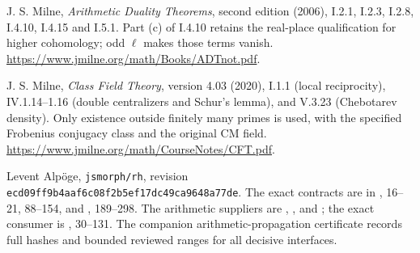 J. S. Milne, \emph{Arithmetic Duality Theorems}, second edition (2006),
I.2.1, I.2.3, I.2.8, I.4.10, I.4.15 and I.5.1.
Part (c) of I.4.10 retains the real-place qualification for higher
cohomology; odd $\ell$ makes those terms vanish.
\url{https://www.jmilne.org/math/Books/ADTnot.pdf}.

J. S. Milne, \emph{Class Field Theory}, version 4.03 (2020),
I.1.1 (local reciprocity), IV.1.14--1.16 (double centralizers and Schur's
lemma), and V.3.23 (Chebotarev density).
Only existence outside finitely many primes is used, with the
specified Frobenius conjugacy class and the original CM field.
\url{https://www.jmilne.org/math/CourseNotes/CFT.pdf}.

Levent Alp\"oge, \texttt{jsmorph/rh},
revision \texttt{ecd09ff9b4aaf6c08f2b5ef17dc49ca9648a77de}.
The exact contracts are in
, 16--21,
88--154, and ,
189--298.  The arithmetic suppliers are
,
, and
; the exact
consumer is , 30--131.
The companion arithmetic-propagation certificate records full hashes
and bounded reviewed ranges for all decisive interfaces.
